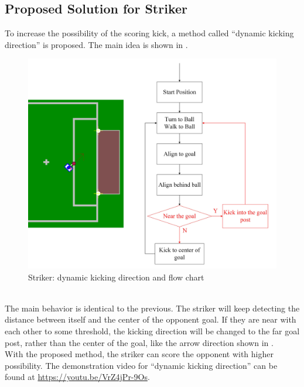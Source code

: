 \subsection{Proposed Solution for Striker}
To increase the possibility of the scoring kick, a method called ``dynamic kicking direction'' is proposed. The main idea is shown in .
\begin{figure}[!htb]
  \centering
  \includegraphics[width=\textwidth]{pics/Dy_Striker}
  \caption{Striker: dynamic kicking direction and flow chart }
  \label{fig: DyStrik}
\end{figure}\\
The main behavior is identical to the previous. The striker will keep detecting the distance between itself and the center of the opponent goal. If they are near with each other to some threshold, the kicking direction will be changed to the far goal post, rather than the center of the goal, like the arrow direction shown in .\\
With the proposed method, the striker can score the opponent with higher possibility. The demonstration video for ``dynamic kicking direction'' can be found at \url{https://youtu.be/VrZ4jPr-9Os}.
